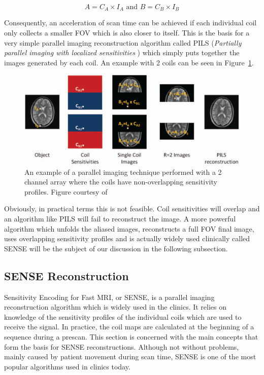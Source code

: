 \begin{equation}
    A = C_A \times I_A \text{ and } B = C_B \times I_B
\end{equation}

Consequently, an acceleration of scan time can be achieved if each individual coil only collects a smaller FOV which is also closer to itself. This is the basis for a very simple parallel imaging reconstruction algorithm called PILS (\textit{Partially parallel imaging with localized sensitivities} \cite{Griswold2000}) which simply puts together the images generated by each coil. An example with 2 coils can be seen in Figure~\ref{fig:pils}.

\begin{figure}[ht]
    \centering
    \includegraphics[width=\textwidth,keepaspectratio]{pils}
    \caption{An example of a parallel imaging technique performed with a 2 channel array where the coils have non-overlapping sensitivity profiles. Figure courtesy of \cite{Deshmane2012}}
    \label{fig:pils}
\end{figure}

Obviously, in practical terms this is not feasible. Coil sensitivities will overlap and an algorithm like PILS will fail to reconstruct the image. A more powerful algorithm which unfolds the aliased images, reconstructs a full FOV final image, uses overlapping sensitivity profiles and is actually widely used clinically called SENSE will be the subject of our discussion in the following subsection.

\subsection{SENSE Reconstruction} \label{sect:senserec}
Sensitivity Encoding for Fast MRI, or SENSE, is a parallel imaging reconstruction algorithm which is widely used in the clinics. It relies on knowledge of the sensitivity profiles of the individual coils which are used to receive the signal. In practice, the coil maps are calculated at the beginning of a sequence during a prescan. This section is concerned with the main concepts that form the basis for SENSE reconstructions. Although not without problems, mainly caused by patient movement during scan time, SENSE is one of the most popular algorithms used in clinics today. 

